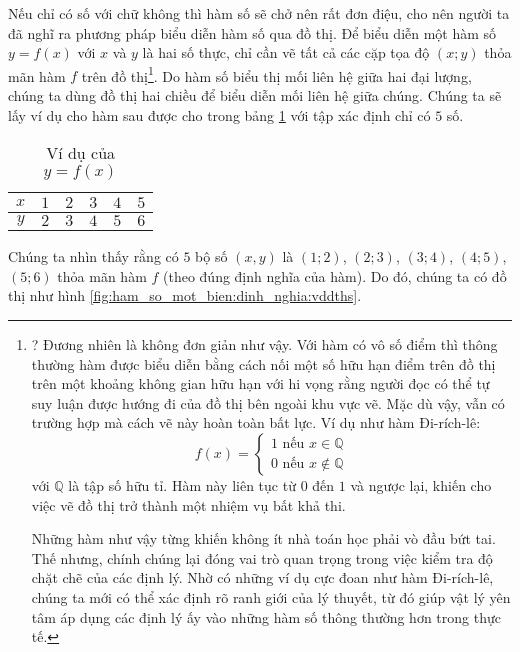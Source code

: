 Nếu chỉ có số với chữ không thì hàm số sẽ chở nên rất đơn điệu, cho nên người ta đã nghĩ ra phương pháp biểu diễn hàm số qua đồ thị. Để biểu diễn một hàm số $y=f(x)$ với $x$ và $y$ là hai số thực, chỉ cần vẽ tất cả các cặp tọa độ $(x; y)$ thỏa mãn hàm $f$ trên đồ thị\footnote{? Đương nhiên là không đơn giản như vậy. Với hàm có vô số điểm thì thông thường hàm được biểu diễn bằng cách nối một số hữu hạn điểm trên đồ thị trên một khoảng không gian hữu hạn với hi vọng rằng người đọc có thể tự suy luận được hướng đi của đồ thị bên ngoài khu vực vẽ. Mặc dù vậy, vẫn có trường hợp mà cách vẽ này hoàn toàn bất lực. Ví dụ như hàm Đi-rích-lê: $$f(x) =
\begin{cases}
   1 \text{ nếu } x\in \mathbb{Q} \\
   0 \text{ nếu } x\notin \mathbb{Q}
\end{cases}$$ với $\mathbb{Q}$ là tập số hữu tỉ. Hàm này liên tục  từ $0$ đến $1$ và ngược lại, khiến cho việc vẽ đồ thị trở thành một nhiệm vụ bất khả thi.

Những hàm  như vậy từng khiến không ít nhà toán học phải vò đầu bứt tai. Thế nhưng, chính chúng lại đóng vai trò quan trọng trong việc kiểm tra độ chặt chẽ của các định lý. Nhờ có những ví dụ cực đoan như hàm Đi-rích-lê, chúng ta mới có thể xác định rõ ranh giới của lý thuyết, từ đó giúp vật lý yên tâm áp dụng các định lý ấy vào những hàm số thông thường hơn trong thực tế.}. Do hàm số biểu thị mối liên hệ giữa hai đại lượng, chúng ta dùng đồ thị hai chiều để biểu diễn mối liên hệ giữa chúng. Chúng ta sẽ lấy ví dụ cho hàm sau được cho trong bảng \ref{tab:ham_so_mot_bien:dinh_nghia:vddths} với tập xác định chỉ có $5$ số.

\begin{table}[h]
   \centering
   \begin{tabular}{|c|c|c|c|c|c|}
      \hline
      $x$ & $1$ & $2$ & $3$ & $4$ & $5$ \\
      \hline
      $y$ & $2$ & $3$ & $4$ & $5$ & $6$ \\
      \hline
   \end{tabular}
   \caption{Ví dụ của $y = f(x)$}
   \label{tab:ham_so_mot_bien:dinh_nghia:vddths}
\end{table}

\noindent Chúng ta nhìn thấy rằng có $5$ bộ số $(x,y)$ là $(1;2)$, $(2;3)$, $(3;4)$, $(4;5)$, $(5;6)$ thỏa mãn hàm $f$ (theo đúng định nghĩa của hàm). Do đó, chúng ta có đồ thị như hình \ref{fig:ham_so_mot_bien:dinh_nghia:vddths}. 

